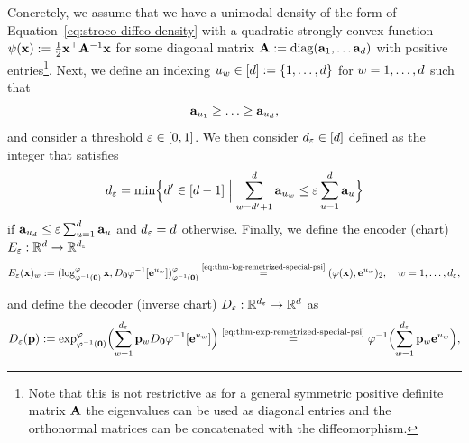 Concretely, we assume that we have a unimodal density of the form of Equation~\ref{eq:stroco-diffeo-density} with a quadratic strongly convex function $\psi(\mathbf{x}):= \frac{1}{2} \mathbf{x}^{\top} \mathbf{A}^{-1} \mathbf{x}$ for some diagonal matrix $\mathbf{A}:= \operatorname{diag}(\mathbf{a}_1, \ldots \mathbf{a}_d)$ with positive entries\footnote{Note that this is not restrictive as for a general symmetric positive definite matrix $\mathbf{A}$ the eigenvalues can be used as diagonal entries and the orthonormal matrices can be concatenated with the diffeomorphism.}. Next, we define an indexing $u_w \in [d]:= \{1, \ldots, d\}$ for $w = 1, \ldots, d$ such that
\begin{equation}
    \mathbf{a}_{u_1}\geq \ldots \geq \mathbf{a}_{u_d},
\end{equation}
and consider a threshold $\varepsilon\in [0,1]$. We then consider $d_\varepsilon \in [d]$ defined as the integer that satisfies
\begin{equation}
    d_\varepsilon = 
 \min \Bigl\{ d'\in [d-1] \; \Bigl\vert \; \sum_{w=d' + 1}^{d} \mathbf{a}_{u_w}  \leq \varepsilon \sum_{u=1}^{d} \mathbf{a}_{u} \Bigr\}
\label{eq:dimind-epsilon}
\end{equation}
if $\mathbf{a}_{u_d}  \leq \varepsilon \sum_{u=1}^{d} \mathbf{a}_{u}$ and $d_\varepsilon = d$ otherwise. Finally, we define the encoder (chart) $E_\varepsilon:\mathbb{R}^d \to \mathbb{R}^{d_\varepsilon}$ 
\begin{equation}
E_\varepsilon(\mathbf{x})_w := (\log^\varphi_{\varphi^{-1}(\mathbf{0})} \mathbf{x}, D_{\mathbf{0}}\varphi^{-1}[\mathbf{e}^{u_w}])^\varphi_{\varphi^{-1}(\mathbf{0})}
\overset{\text{\ref{eq:thm-log-remetrized-special-psi}}}{=} (\varphi(\mathbf{x}), \mathbf{e}^{u_w})_2, \quad w = 1, \ldots, d_\varepsilon,
\label{eq:rae-encoder}
\end{equation}

\noindent and define the decoder (inverse chart) $D_\varepsilon:\mathbb{R}^{d_\varepsilon} \to \mathbb{R}^d$ as
\begin{equation}
D_\varepsilon(\mathbf{p}):= \exp_{\varphi^{-1}(\mathbf{0})}^\varphi \Bigl( \sum_{w=1}^{d_\varepsilon} \mathbf{p}_w D_{\mathbf{0}}\varphi^{-1}[\mathbf{e}^{u_w}]\Bigr)
\overset{\text{\ref{eq:thm-exp-remetrized-special-psi}}}{=} \varphi^{-1} \Bigl( \sum_{w=1}^{d_\varepsilon} \mathbf{p}_w \mathbf{e}^{u_w} \Bigr),
\label{eq:rae-decoder}
\end{equation}


